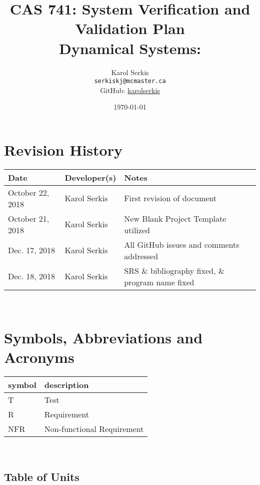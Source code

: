 \documentclass[12pt, titlepage]{article}
\begin{document}
\title{CAS 741: System Verification and Validation Plan\\[10pt]
\Large Dynamical Systems: \progname}
\author{Karol Serkis\\\texttt{serkiskj@mcmaster.ca}\\GitHub:
\href{https://www.github.com/karolserkis}{karolserkis}}
\date{\today}
	
\maketitle


\section{Revision History}

\begin{tabularx}{\textwidth}{p{3.3cm}p{2.5cm}X}
\toprule {\bf Date} & {\bf Developer(s)} & {\bf Notes}\\
\midrule
October 22, 2018 & Karol Serkis & First revision of document\\
October 21, 2018 & Karol Serkis & New Blank Project Template utilized \\
Dec. 17, 2018 & Karol Serkis & All GitHub issues and comments addressed \\
Dec. 18, 2018 & Karol Serkis & SRS \& bibliography fixed, 
\& program name fixed \\
\bottomrule
\end{tabularx}

~\newpage

\section{Symbols, Abbreviations and Acronyms}

\renewcommand{\arraystretch}{1.2}
\begin{tabular}{l l} 
  \toprule		
  \textbf{symbol} & \textbf{description}\\
  \midrule 
  T & Test\\
  R & Requirement\\ 
  NFR & Non-functional Requirement\\ 
  \bottomrule
\end{tabular}\\

\subsection{Table of Units}
\end{document}
